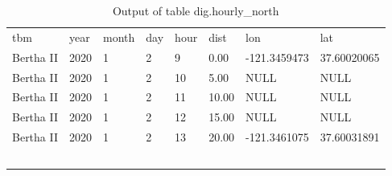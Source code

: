 \documentclass[a4paper,
							12pt,
							oneside,
							openright,
							DIV10,
							numbers=noendperiod
							]{scrreprt} %
\begin{document}
\begin{table}[ht]
\centering
\caption{Output of table dig.hourly\_north}
\label{tab:my-table}
\begin{tabular}{llllllll}
{\color[HTML]{000000} tbm} & {\color[HTML]{000000} year} & {\color[HTML]{000000} month} & {\color[HTML]{000000} day} & {\color[HTML]{000000} hour} & {\color[HTML]{000000} dist} & {\color[HTML]{000000} lon} & {\color[HTML]{000000} lat} \\
{\color[HTML]{000000} Bertha II} & {\color[HTML]{000000} 2020} & {\color[HTML]{000000} 1} & {\color[HTML]{000000} 2} & {\color[HTML]{000000} 9} & {\color[HTML]{000000} 0.00} & {\color[HTML]{000000} -121.3459473} & {\color[HTML]{000000} 37.60020065} \\
{\color[HTML]{000000} Bertha II} & {\color[HTML]{000000} 2020} & {\color[HTML]{000000} 1} & {\color[HTML]{000000} 2} & {\color[HTML]{000000} 10} & {\color[HTML]{000000} 5.00} & {\color[HTML]{000000} NULL} & {\color[HTML]{000000} NULL} \\
{\color[HTML]{000000} Bertha II} & {\color[HTML]{000000} 2020} & {\color[HTML]{000000} 1} & {\color[HTML]{000000} 2} & {\color[HTML]{000000} 11} & {\color[HTML]{000000} 10.00} & {\color[HTML]{000000} NULL} & {\color[HTML]{000000} NULL} \\
{\color[HTML]{000000} Bertha II} & {\color[HTML]{000000} 2020} & {\color[HTML]{000000} 1} & {\color[HTML]{000000} 2} & {\color[HTML]{000000} 12} & {\color[HTML]{000000} 15.00} & {\color[HTML]{000000} NULL} & {\color[HTML]{000000} NULL} \\
{\color[HTML]{000000} Bertha II} & {\color[HTML]{000000} 2020} & {\color[HTML]{000000} 1} & {\color[HTML]{000000} 2} & {\color[HTML]{000000} 13} & {\color[HTML]{000000} 20.00} & {\color[HTML]{000000} -121.3461075} & {\color[HTML]{000000} 37.60031891} \\
{\color[HTML]{000000} } & {\color[HTML]{000000} } & {\color[HTML]{000000} } & {\color[HTML]{000000} } & {\color[HTML]{000000} } & {\color[HTML]{000000} } & {\color[HTML]{000000} } &  \\
{\color[HTML]{000000} } & {\color[HTML]{000000} } & {\color[HTML]{000000} } & {\color[HTML]{000000} } & {\color[HTML]{000000} } & {\color[HTML]{000000} } & {\color[HTML]{000000} } &  \\
{\color[HTML]{000000} } & {\color[HTML]{000000} } & {\color[HTML]{000000} } & {\color[HTML]{000000} } & {\color[HTML]{000000} } & {\color[HTML]{000000} } & {\color[HTML]{000000} } &  \\
{\color[HTML]{000000} } & {\color[HTML]{000000} } & {\color[HTML]{000000} } & {\color[HTML]{000000} } & {\color[HTML]{000000} } & {\color[HTML]{000000} } & {\color[HTML]{000000} } &  \\
{\color[HTML]{000000} } & {\color[HTML]{000000} } & {\color[HTML]{000000} } & {\color[HTML]{000000} } & {\color[HTML]{000000} } & {\color[HTML]{000000} } & {\color[HTML]{000000} } & 
\end{tabular}
\end{table}
\end{document}
